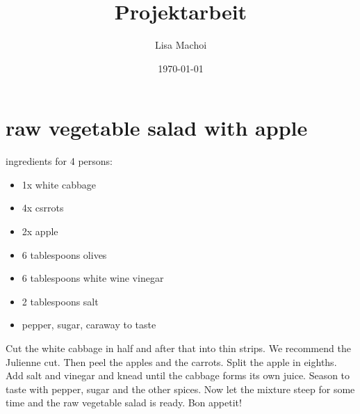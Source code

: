\documentclass[10pt,a4paper,oneside]{article}
\begin{document}
\title{Projektarbeit}
\author{Lisa Machoi}
\date{\today}
\maketitle
\newpage
\tableofcontents
\newpage
\setcounter{secnumdepth}{1}
\section{raw vegetable salad with apple}
ingredients for 4 persons:
\begin{itemize}  
	\item 1x white cabbage
	\item 4x csrrots
	\item 2x apple
	\item 6 tablespoons olives
	\item 6 tablespoons white wine vinegar
	\item 2 tablespoons salt 
	\item pepper, sugar, caraway to taste
\end{itemize}
Cut the white cabbage in half and after that into thin strips. 
We recommend the Julienne cut. Then peel the apples and the carrots.
Split the apple in eighths. 
Add salt and vinegar and knead until the cabbage forms its own juice. 
Season to taste with pepper, sugar and the other spices.
Now let the mixture steep for some time and the raw vegetable salad is ready. 
Bon appetit!
\end{document}
